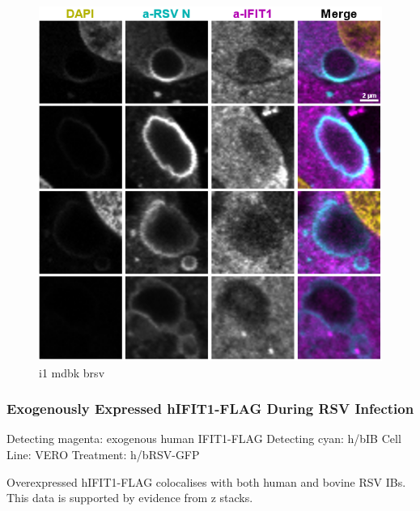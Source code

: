 \begin{figure}
    \centering
    \includegraphics[width=1\linewidth]{08. Chapter 3/Figs/02. IFIT1/06. mdbk brsv.png}
    \caption[i1 mdbk brsv]{i1 mdbk brsv}
    \label{i1 mdbk brsv}
\end{figure}

\subsubsection{Exogenously Expressed hIFIT1-FLAG During RSV Infection} \label{Exogenously Expressed hIFIT1-FLAG During RSV Infection}
Detecting magenta: exogenous human IFIT1-FLAG \newline
Detecting cyan: h/bIB \newline
Cell Line: VERO \newline
Treatment: h/bRSV-GFP \newline

Overexpressed hIFIT1-FLAG colocalises with both human and bovine RSV IBs. This data is supported by evidence from z stacks.

